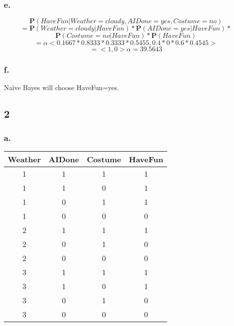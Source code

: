\documentclass{article}
\begin{document}
            \subsubsection{e.}
                $$\textbf{P}(HaveFun|Weather=cloudy,AIDone=yes,Costume=no)$$
                $$=\textbf{P}(Weather=cloudy|HaveFun)*\textbf{P}(AIDone=yes|HaveFun)*$$
		$$\textbf{P}(Costume=no|HaveFun)*\textbf{P}(HaveFun)$$
                $$=\alpha<0.1667*0.8333*0.3333*0.5455, 0.4*0*0.6*0.4545>$$
                $$=<1,0>\alpha=39.5643$$
            \subsubsection{f.}
                Na\"ive Bayes will choose HaveFun=yes.
        \subsection{2}
            \subsubsection{a.}
                \begin{tabular}{|c|c|c|c|}
                    \hline
                        \textbf{Weather}&\textbf{AIDone}&\textbf{Costume}&\textbf{HaveFun}\\
                    \hline
                        1&1&1&1\\
                    \hline
                        1&1&0&1\\
                    \hline
                        1&0&1&1\\
                    \hline
                        1&0&0&0\\
                    \hline
                        2&1&1&1\\
                    \hline
                        2&0&1&0\\
                    \hline
                        2&0&0&0\\
                    \hline
                        3&1&1&1\\
                    \hline
                        3&1&0&1\\
                    \hline
                        3&0&1&0\\
                    \hline
                        3&0&0&0\\
                    \hline
                \end{tabular}
\end{document}
